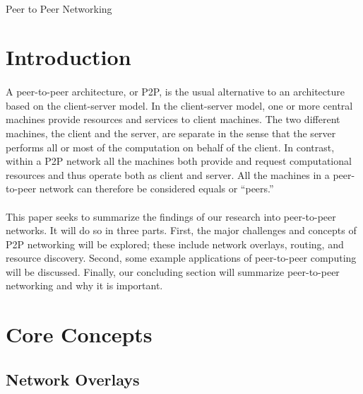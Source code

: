 \documentclass[12pt,letterpaper]{article}
\begin{document}
\onehalfspacing

\paragraph{}
\begin{center}
\Large Peer to Peer Networking
\end{center}

\section{Introduction}

\paragraph{}

A peer-to-peer architecture, or P2P, is the usual alternative to an architecture based on the client-server model.
In the client-server model, one or more central machines provide resources and services to client machines.
The two different machines, the client and the server, are separate in the sense that the server performs all or most of the computation on behalf of the client.
In contrast, within a P2P network all the machines both provide and request computational resources and thus operate both as client and server. All the machines in a peer-to-peer network can therefore be considered equals or ``peers.''

\paragraph{}

This paper seeks to summarize the findings of our research into peer-to-peer networks.
It will do so in three parts. First, the major challenges and concepts of P2P networking will be explored; these include network overlays, routing, and resource discovery.
Second, some example applications of peer-to-peer computing will be discussed.
Finally, our concluding section will summarize peer-to-peer networking and why it is important.

\section{Core Concepts}

\subsection{Network Overlays}
\end{document}
